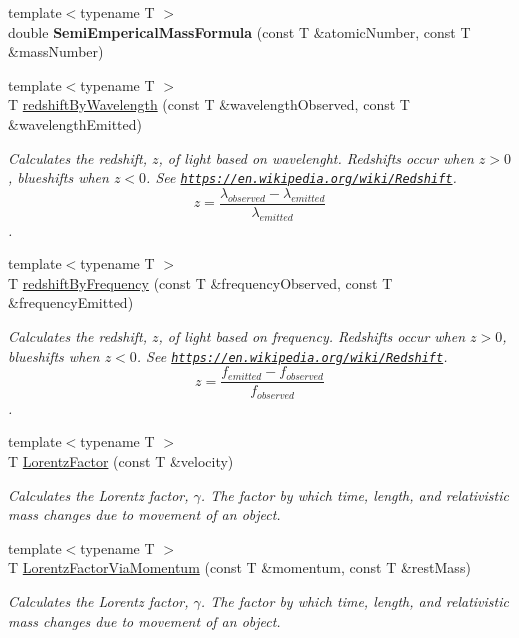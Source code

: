 \begin{DoxyCompactItemize}
{\footnotesize template$<$typename T $>$ }\\double {\bfseries Semi\+Emperical\+Mass\+Formula} (const T \&atomic\+Number, const T \&mass\+Number)
\item 
{\footnotesize template$<$typename T $>$ }\\T \hyperlink{group___optics_ga29300a13e34da35332ca2d447b5ce82d}{redshift\+By\+Wavelength} (const T \&wavelength\+Observed, const T \&wavelength\+Emitted)
\begin{DoxyCompactList}\small\item\em Calculates the redshift, $z$, of light based on wavelenght. Redshifts occur when $z > 0$, blueshifts when $z < 0$. See \href{https://en.wikipedia.org/wiki/Redshift}{\tt https\+://en.\+wikipedia.\+org/wiki/\+Redshift}. \[z=\frac{\lambda_{observed}-\lambda_{emitted}}{\lambda_{emitted}}\]. \end{DoxyCompactList}\item 
{\footnotesize template$<$typename T $>$ }\\T \hyperlink{group___optics_gacc6d3b2922061214d64b89a4b8e3967a}{redshift\+By\+Frequency} (const T \&frequency\+Observed, const T \&frequency\+Emitted)
\begin{DoxyCompactList}\small\item\em Calculates the redshift, $z$, of light based on frequency. Redshifts occur when $z > 0$, blueshifts when $z < 0$. See \href{https://en.wikipedia.org/wiki/Redshift}{\tt https\+://en.\+wikipedia.\+org/wiki/\+Redshift}. \[z=\frac{f_{emitted}-f_{observed}}{f_{observed}}\]. \end{DoxyCompactList}\item 
{\footnotesize template$<$typename T $>$ }\\T \hyperlink{group___relativity_ga5f9b11c1f4c3ae26a7e64f02c22d5a75}{Lorentz\+Factor} (const T \&velocity)
\begin{DoxyCompactList}\small\item\em Calculates the Lorentz factor, $\gamma$. The factor by which time, length, and relativistic mass changes due to movement of an object. \end{DoxyCompactList}\item 
{\footnotesize template$<$typename T $>$ }\\T \hyperlink{group___relativity_ga1ea24128654ac333dd843afdd5c003b7}{Lorentz\+Factor\+Via\+Momentum} (const T \&momentum, const T \&rest\+Mass)
\begin{DoxyCompactList}\small\item\em Calculates the Lorentz factor, $\gamma$. The factor by which time, length, and relativistic mass changes due to movement of an object. \end{DoxyCompactList}\item 

\end{DoxyCompactItemize}
